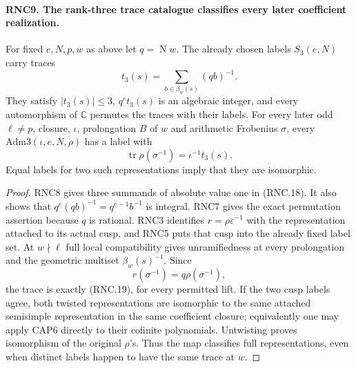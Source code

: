\paragraph{RNC9. The rank-three trace catalogue classifies every later coefficient realization.}
\label{claim:RNC9}
For fixed $e,N,p,w$ as above let $q=\operatorname{N}w$.
The already chosen labels $S_3(e,N)$ carry traces
\[
                    t_3(s)=\sum_{b\in\beta_w(s)}(qb)^{-1}.
                                                               \tag{RNC.18}
\]
They satisfy $|t_3(s)|\leq3$, $q^e t_3(s)$ is an algebraic
integer, and every automorphism of $\mathbb C$ permutes
the traces with their labels.  For every later odd
$\ell\ne p$, closure, $\iota$, prolongation $B$ of $w$
and arithmetic Frobenius $\sigma$, every
$\mathrm{Adm3}(\iota,e,N,\rho)$ has a label with
\[
        \operatorname{tr}\rho(\sigma^{-1})=\iota^{-1}t_3(s).
                                                               \tag{RNC.19}
\]
Equal labels for two such representations imply that they
are isomorphic.
\begin{proof}
RNC8 gives three summands of absolute value one in
(RNC.18).  It also shows that
$q^e(qb)^{-1}=q^{e-1}b^{-1}$ is integral.  RNC7 gives
the exact permutation assertion because $q$ is rational.
RNC3 identifies $r=\rho\varepsilon^{-1}$ with the
representation attached to its actual cusp, and RNC5
puts that cusp into the already fixed label set.
At $w\nmid\ell$ full local compatibility gives
unramifiedness at every prolongation and the geometric
multiset $\beta_w(s)^{-1}$.  Since
\[
             r(\sigma^{-1})=q\rho(\sigma^{-1}),
                                                               \tag{RNC.20}
\]
the trace is exactly (RNC.19), for every permitted lift.
If the two cusp labels agree, both twisted representations
are isomorphic to the same attached semisimple
representation in the same coefficient closure; equivalently
one may apply CAP6 directly to their cofinite polynomials.
Untwisting proves isomorphism of the original $\rho$'s.
Thus the map classifies full representations, even when
distinct labels happen to have the same trace at $w$.
\end{proof}

